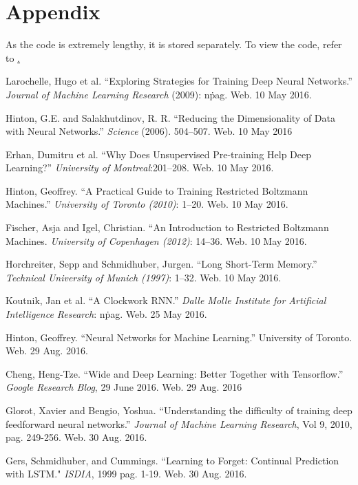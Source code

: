 \documentclass{article}
\begin{document}
\section{Appendix}
As the code is extremely lengthy, it is stored separately. To view the code,
refer to \href{https://github.com/Peachball/EE-DeepLearning}.


\begin{thebibliography}{9}
		Larochelle, Hugo et al. ``Exploring Strategies for Training Deep Neural
		Networks.'' \textit{Journal of Machine Learning Research} (2009): n\. pag.
		Web. 10 May 2016.

		Hinton, G.E. and Salakhutdinov, R. R. ``Reducing the Dimensionality of
		Data with Neural Networks.'' \textit{Science} (2006). 504--507. Web. 10
		May 2016

		Erhan, Dumitru et al. ``Why Does Unsupervised Pre-training Help Deep
		Learning?'' \textit{University of Montreal}:201--208. Web. 10 May 2016.

		Hinton, Geoffrey. ``A Practical Guide to Training Restricted Boltzmann
		Machines.'' \textit{University of Toronto (2010)}: 1--20. Web. 10 May
		2016.

		Fischer, Asja and Igel, Christian. ``An Introduction to Restricted
		Boltzmann Machines. \textit{University of Copenhagen (2012)}: 14--36. Web.
		10 May 2016.

		Horchreiter, Sepp and Schmidhuber, Jurgen. ``Long Short-Term Memory.''
		\textit{Technical University of Munich (1997)}: 1--32. Web. 10 May 2016.

		Koutnik, Jan et al. ``A Clockwork RNN.'' \textit{Dalle Molle Institute
		for Artificial Intelligence Research}: n\. pag. Web. 25 May 2016.

		Hinton, Geoffrey. ``Neural Networks for Machine Learning.'' University
		of Toronto. Web. 29 Aug. 2016.

		Cheng, Heng-Tze. ``Wide and Deep Learning: Better Together with
		Tensorflow.'' \textit{Google Research Blog}, 29 June 2016. Web. 29 Aug.
		2016

		Glorot, Xavier and Bengio, Yoshua. ``Understanding the difficulty of
		training deep feedforward neural networks.'' \textit{Journal of Machine
		Learning Research}, Vol 9, 2010, pag. 249-256. Web. 30 Aug. 2016.

		Gers, Schmidhuber, and Cummings. ``Learning to Forget: Continual
		Prediction with LSTM." \textit{ISDIA}, 1999 pag. 1-19. Web. 30 Aug.
		2016.


\end{thebibliography}
\end{document}
